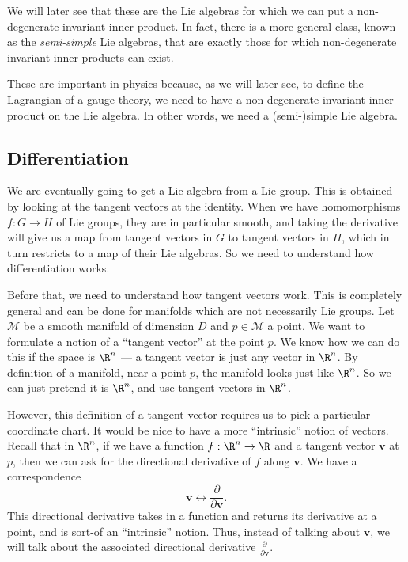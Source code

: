 \documentclass[a4paper]{article}
\begin{document}
We will later see that these are the Lie algebras for which we can put a non-degenerate invariant inner product. In fact, there is a more general class, known as the \emph{semi-simple} Lie algebras, that are exactly those for which non-degenerate invariant inner products can exist.

These are important in physics because, as we will later see, to define the Lagrangian of a gauge theory, we need to have a non-degenerate invariant inner product on the Lie algebra. In other words, we need a (semi-)simple Lie algebra.


\subsection{Differentiation}
We are eventually going to get a Lie algebra from a Lie group. This is obtained by looking at the tangent vectors at the identity. When we have homomorphisms $f: G \to H$ of Lie groups, they are in particular smooth, and taking the derivative will give us a map from tangent vectors in $G$ to tangent vectors in $H$, which in turn restricts to a map of their Lie algebras. So we need to understand how differentiation works.

Before that, we need to understand how tangent vectors work. This is completely general and can be done for manifolds which are not necessarily Lie groups. Let $\mathcal{M}$ be a smooth manifold of dimension $D$ and $p \in \mathcal{M}$ a point. We want to formulate a notion of a ``tangent vector'' at the point $p$. We know how we can do this if the space is $\R^n$ --- a tangent vector is just any vector in $\R^n$. By definition of a manifold, near a point $p$, the manifold looks just like $\R^n$. So we can just pretend it is $\R^n$, and use tangent vectors in $\R^n$.

However, this definition of a tangent vector requires us to pick a particular coordinate chart. It would be nice to have a more ``intrinsic'' notion of vectors. Recall that in $\R^n$, if we have a function $f: \R^n \to \R$ and a tangent vector $\mathbf{v}$ at $p$, then we can ask for the directional derivative of $f$ along $\mathbf{v}$. We have a correspondence
\[
  \mathbf{v} \longleftrightarrow \frac{\partial}{\partial \mathbf{v}}.
\]
This directional derivative takes in a function and returns its derivative at a point, and is sort-of an ``intrinsic'' notion. Thus, instead of talking about $\mathbf{v}$, we will talk about the associated directional derivative $\frac{\partial}{\partial \mathbf{v}}$.
\end{document}

